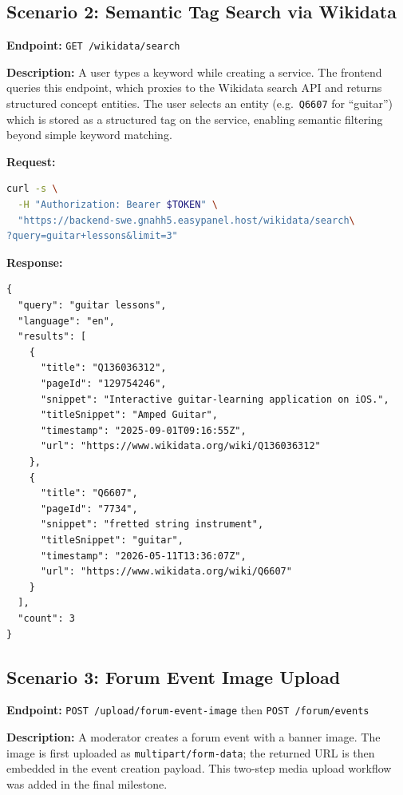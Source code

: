 \documentclass[11pt,a4paper]{report}
\begin{document}
\subsection{Scenario 2: Semantic Tag Search via Wikidata}

\textbf{Endpoint:} \texttt{GET /wikidata/search}

\textbf{Description:} A user types a keyword while creating a service. The frontend queries this endpoint, which proxies to the Wikidata search API and returns structured concept entities. The user selects an entity (e.g.\ \texttt{Q6607} for ``guitar'') which is stored as a structured tag on the service, enabling semantic filtering beyond simple keyword matching.

\textbf{Request:}
\begin{lstlisting}[language=bash]
curl -s \
  -H "Authorization: Bearer $TOKEN" \
  "https://backend-swe.gnahh5.easypanel.host/wikidata/search\
?query=guitar+lessons&limit=3"
\end{lstlisting}

\textbf{Response:}
\begin{lstlisting}
{
  "query": "guitar lessons",
  "language": "en",
  "results": [
    {
      "title": "Q136036312",
      "pageId": "129754246",
      "snippet": "Interactive guitar-learning application on iOS.",
      "titleSnippet": "Amped Guitar",
      "timestamp": "2025-09-01T09:16:55Z",
      "url": "https://www.wikidata.org/wiki/Q136036312"
    },
    {
      "title": "Q6607",
      "pageId": "7734",
      "snippet": "fretted string instrument",
      "titleSnippet": "guitar",
      "timestamp": "2026-05-11T13:36:07Z",
      "url": "https://www.wikidata.org/wiki/Q6607"
    }
  ],
  "count": 3
}
\end{lstlisting}

\subsection{Scenario 3: Forum Event Image Upload}

\textbf{Endpoint:} \texttt{POST /upload/forum-event-image} then \texttt{POST /forum/events}

\textbf{Description:} A moderator creates a forum event with a banner image. The image is first uploaded as \texttt{multipart/form-data}; the returned URL is then embedded in the event creation payload. This two-step media upload workflow was added in the final milestone.
\end{document}
